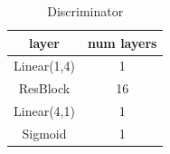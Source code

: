 \begin{table}[ht]
\caption{Discriminator} %
\centering %
\begin{tabular}{c c} %
\hline\hline %
layer & num layers\\%
\hline %
Linear(1,4) & 1\\ %
ResBlock & 16 \\
Linear(4,1) & 1 \\
Sigmoid & 1 \\
\hline %
\end{tabular}
\label{table:1d_D} %
\end{table}
